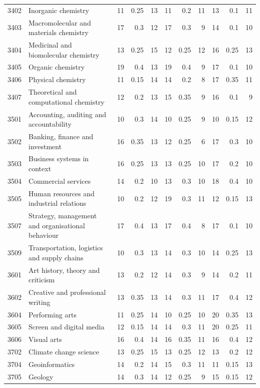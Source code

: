 \begin{longtable}{r p{2.15cm} rrr rrr rrr}
3402 & Inorganic chemistry & 11 & 0.25 & 13 & 11 & 0.2 & 11 & 13 & 0.1 & 11 \\
3403 & Macromolecular and materials chemistry & 17 & 0.3 & 12 & 17 & 0.3 & 9 & 14 & 0.1 & 10 \\
3404 & Medicinal and biomolecular chemistry & 13 & 0.25 & 15 & 12 & 0.25 & 12 & 16 & 0.25 & 13 \\
3405 & Organic chemistry & 19 & 0.4 & 13 & 19 & 0.4 & 9 & 17 & 0.1 & 10 \\
3406 & Physical chemistry & 11 & 0.15 & 14 & 14 & 0.2 & 8 & 17 & 0.35 & 11 \\
3407 & Theoretical and computational chemistry & 12 & 0.2 & 13 & 15 & 0.35 & 9 & 16 & 0.1 & 9 \\
3501 & Accounting, auditing and accountability & 10 & 0.3 & 14 & 10 & 0.25 & 9 & 10 & 0.15 & 12 \\
3502 & Banking, finance and investment & 16 & 0.35 & 13 & 12 & 0.25 & 6 & 17 & 0.3 & 10 \\
3503 & Business systems in context & 16 & 0.25 & 13 & 13 & 0.25 & 10 & 17 & 0.2 & 10 \\
3504 & Commercial services & 14 & 0.2 & 10 & 13 & 0.3 & 10 & 18 & 0.4 & 10 \\
3505 & Human resources and industrial relations & 10 & 0.2 & 12 & 19 & 0.3 & 11 & 12 & 0.15 & 13 \\
3507 & Strategy, management and organisational behaviour & 17 & 0.4 & 13 & 17 & 0.4 & 8 & 17 & 0.1 & 10 \\
3509 & Transportation, logistics and supply chains & 10 & 0.3 & 13 & 14 & 0.3 & 10 & 14 & 0.25 & 13 \\
3601 & Art history, theory and criticism & 13 & 0.2 & 12 & 14 & 0.3 & 9 & 14 & 0.2 & 11 \\
3602 & Creative and professional writing & 13 & 0.35 & 13 & 14 & 0.3 & 11 & 17 & 0.4 & 12 \\
3604 & Performing arts & 11 & 0.25 & 14 & 10 & 0.25 & 10 & 20 & 0.35 & 13 \\
3605 & Screen and digital media & 12 & 0.15 & 14 & 14 & 0.3 & 11 & 20 & 0.25 & 11 \\
3606 & Visual arts & 16 & 0.4 & 14 & 16 & 0.35 & 11 & 16 & 0.4 & 12 \\
3702 & Climate change science & 13 & 0.25 & 15 & 13 & 0.25 & 12 & 13 & 0.2 & 12 \\
3704 & Geoinformatics & 14 & 0.2 & 14 & 15 & 0.3 & 11 & 11 & 0.15 & 13 \\
3705 & Geology & 14 & 0.3 & 14 & 12 & 0.25 & 9 & 15 & 0.15 & 12 \\

\end{longtable}
